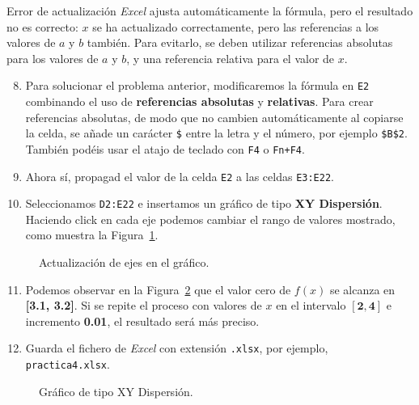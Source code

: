 \documentclass[
  spanish,
  11pt,
  a4paper,
  DIV=11,
  numbers=noendperiod]{scrartcl}
\begin{document}
\begin{PracticeWarningBox}{Error de actualización}
\emph{Excel} ajusta automáticamente la fórmula, pero el resultado no es correcto: \(x\) se ha actualizado correctamente, pero las referencias a los valores de \(a\) y \(b\) también. Para evitarlo, se deben utilizar referencias absolutas para los valores de \(a\) y \(b\), y una referencia relativa para el valor de \(x\).
\end{PracticeWarningBox}

\begin{enumerate}
\setcounter{enumi}{7}
\item Para solucionar el problema anterior, modificaremos la fórmula en \texttt{E2} combinando el uso de \textbf{referencias absolutas} y \textbf{relativas}. Para crear referencias absolutas, de modo que no cambien automáticamente al copiarse la celda, se añade un carácter \texttt{\$} entre la letra y el número, por ejemplo \texttt{\$B\$2}. También podéis usar el atajo de teclado con \texttt{F4} o \texttt{Fn+F4}.
\item Ahora sí, propagad el valor de la celda \texttt{E2} a las celdas \texttt{E3:E22}.
\item Seleccionamos \texttt{D2:E22} e insertamos un gráfico de tipo \textbf{XY Dispersión}. Haciendo click en cada eje podemos cambiar el rango de valores mostrado, como muestra la Figura~\ref{fig-grafico-limites-ejes}.
\end{enumerate}

\begin{figure}[H]
\caption{Actualización de ejes en el gráfico.}\label{fig-grafico-limites-ejes}
\end{figure}

\begin{enumerate}
\setcounter{enumi}{10}
\item Podemos observar en la Figura~\ref{fig-grafico-xy-dispersion} que el valor cero de \(f(x)\) se alcanza en \textbf{[3.1, 3.2]}. Si se repite el proceso con valores de \(x\) en el intervalo \(\mathbf{[2, 4]}\) e incremento \textbf{0.01}, el resultado será más preciso.
\item Guarda el fichero de \emph{Excel} con extensión \texttt{.xlsx}, por ejemplo, \texttt{practica4.xlsx}.
\end{enumerate}

\begin{figure}[H]
\caption{Gráfico de tipo XY Dispersión.}\label{fig-grafico-xy-dispersion}
\end{figure}
\end{document}
